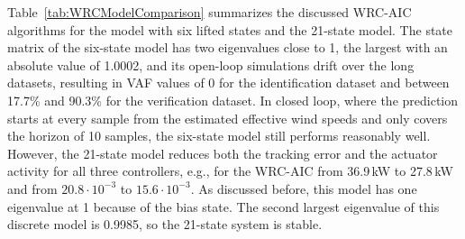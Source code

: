 Table~\ref{tab:WRCModelComparison} summarizes the discussed WRC-AIC algorithms for the model with six lifted states and the 21-state model. The state matrix of the six-state model has two eigenvalues close to 1, the largest with an absolute value of 1.0002, and its open-loop simulations drift over the long datasets, resulting in VAF values of 0 for the identification dataset and between 17.7\% and 90.3\% for the verification dataset. In closed loop, where the prediction starts at every sample from the estimated effective wind speeds and only covers the horizon of 10 samples, the six-state model still performs reasonably well. However, the 21-state model reduces both the tracking error and the actuator activity for all three controllers, e.g., for the WRC-AIC from 36.9\,kW to 27.8\,kW and from $20.8 \cdot 10^{-3}$ to $15.6 \cdot 10^{-3}$. As discussed before, this model has one eigenvalue at 1 because of the bias state. The second largest eigenvalue of this discrete model is 0.9985, so the 21-state system is stable.


